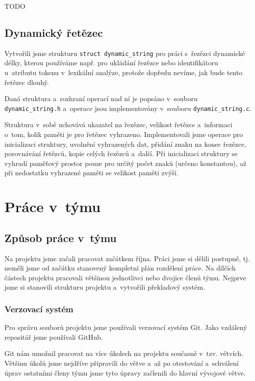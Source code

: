 \documentclass[a4paper, 11pt]{article}
\begin{document}
	TODO


	\subsection{Dynamický řetězec}

	Vytvořili jsme strukturu \texttt{struct dynamic\_string} pro práci s~řezězci dynamické délky, kterou používáme
	např. pro ukládání řezězce nebo identifikátoru u~atributu tokenu v~lexikální analýze, protože dopředu nevíme,
	jak bude tento řetězec dlouhý.

	Daná struktura a~rozhraní operací nad ní je popsáno v~souboru \texttt{dynamic\_string.h} a~operace jsou implementovány
	v~souboru \texttt{dynamic\_string.c}.

	Struktura v~sobě uchovává ukazatel na řezězec, velikost řetězce a~informaci o~tom, kolik paměti je pro
	řetězec vyhrazeno. Implementovali jsme operace pro inicializaci struktury, uvolnění vyhrazených dat,
	přidání znaku na konec řezězce, porovnávání řetězců, kopie celých řezězců a~další. Při inicializaci struktury
	se vyhradí paměťový prostor pouze pro určitý počet znaků (určeno konstantou), až při nedostatku vyhrazené
	paměti se velikost paměti zvýší.


	\section{Práce v~týmu}

	\subsection{Způsob práce v~týmu}

	Na projektu jsme začali pracovat začátkem října. Práci jsme si dělili postupně, tj. neměli jsme od začátku
	stanovený kompletní plán rozdělení práce. Na dílčích částech projektu pracovali většinou jednotlivci nebo
	dvojice členů týmu. Nejprve jsme si stanovili strukturu projektu a~vytvořili překladový systém.

	\subsubsection{Verzovací systém}

	Pro správu souborů projektu jsme používali verzovací systém Git. Jako vzdálený repositář jsme používali \mbox{GitHub}.

	Git nám umožnil pracovat na více úkolech na projektu současně v~tzv. větvích. Většinu úkolů jsme nejdříve připravili
	do větve a~až po otestování a~schválení úprav ostatními členy týmu jsme tyto úpravy začlenili do hlavní
	vývojové větve.
\end{document}
